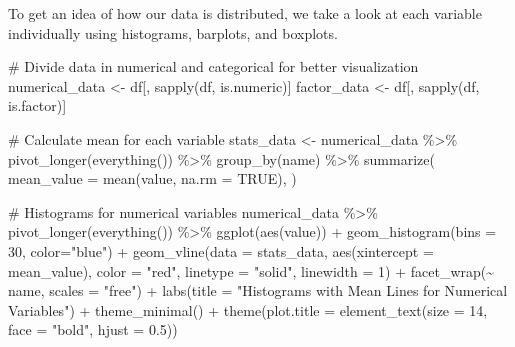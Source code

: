 \documentclass[
  letterpaper,
  DIV=11,
  numbers=noendperiod]{scrartcl}
\newenvironment{Shaded}{\begin{snugshade}}{\end{snugshade}}
\newcommand{\AttributeTok}[1]{\textcolor[rgb]{0.40,0.45,0.13}{#1}}
\newcommand{\CommentTok}[1]{\textcolor[rgb]{0.37,0.37,0.37}{#1}}
\newcommand{\ConstantTok}[1]{\textcolor[rgb]{0.56,0.35,0.01}{#1}}
\newcommand{\DecValTok}[1]{\textcolor[rgb]{0.68,0.00,0.00}{#1}}
\newcommand{\FloatTok}[1]{\textcolor[rgb]{0.68,0.00,0.00}{#1}}
\newcommand{\FunctionTok}[1]{\textcolor[rgb]{0.28,0.35,0.67}{#1}}
\newcommand{\NormalTok}[1]{\textcolor[rgb]{0.00,0.23,0.31}{#1}}
\newcommand{\OtherTok}[1]{\textcolor[rgb]{0.00,0.23,0.31}{#1}}
\newcommand{\SpecialCharTok}[1]{\textcolor[rgb]{0.37,0.37,0.37}{#1}}
\newcommand{\StringTok}[1]{\textcolor[rgb]{0.13,0.47,0.30}{#1}}
\begin{document}
To get an idea of how our data is distributed, we take a look at each
variable individually using histograms, barplots, and boxplots.

\begin{Shaded}
\begin{Highlighting}[]
\CommentTok{\# Divide data in numerical and categorical for better visualization}
\NormalTok{numerical\_data }\OtherTok{\textless{}{-}}\NormalTok{ df[, }\FunctionTok{sapply}\NormalTok{(df, is.numeric)]}
\NormalTok{factor\_data }\OtherTok{\textless{}{-}}\NormalTok{ df[, }\FunctionTok{sapply}\NormalTok{(df, is.factor)]}
\end{Highlighting}
\end{Shaded}

\begin{Shaded}
\begin{Highlighting}[]
\CommentTok{\# Calculate mean for each variable}
\NormalTok{stats\_data }\OtherTok{\textless{}{-}}\NormalTok{ numerical\_data }\SpecialCharTok{\%\textgreater{}\%}
  \FunctionTok{pivot\_longer}\NormalTok{(}\FunctionTok{everything}\NormalTok{()) }\SpecialCharTok{\%\textgreater{}\%}
  \FunctionTok{group\_by}\NormalTok{(name) }\SpecialCharTok{\%\textgreater{}\%}
  \FunctionTok{summarize}\NormalTok{(}
    \AttributeTok{mean\_value =} \FunctionTok{mean}\NormalTok{(value, }\AttributeTok{na.rm =} \ConstantTok{TRUE}\NormalTok{),}
\NormalTok{  )}

\CommentTok{\# Histograms for numerical variables}
\NormalTok{numerical\_data }\SpecialCharTok{\%\textgreater{}\%}
  \FunctionTok{pivot\_longer}\NormalTok{(}\FunctionTok{everything}\NormalTok{()) }\SpecialCharTok{\%\textgreater{}\%}
  \FunctionTok{ggplot}\NormalTok{(}\FunctionTok{aes}\NormalTok{(value)) }\SpecialCharTok{+}
  \FunctionTok{geom\_histogram}\NormalTok{(}\AttributeTok{bins =} \DecValTok{30}\NormalTok{, }\AttributeTok{color=}\StringTok{"blue"}\NormalTok{) }\SpecialCharTok{+}
  \FunctionTok{geom\_vline}\NormalTok{(}\AttributeTok{data =}\NormalTok{ stats\_data, }\FunctionTok{aes}\NormalTok{(}\AttributeTok{xintercept =}\NormalTok{ mean\_value), }\AttributeTok{color =} \StringTok{"red"}\NormalTok{, }
             \AttributeTok{linetype =} \StringTok{"solid"}\NormalTok{, }\AttributeTok{linewidth =} \DecValTok{1}\NormalTok{) }\SpecialCharTok{+}
  \FunctionTok{facet\_wrap}\NormalTok{(}\SpecialCharTok{\textasciitilde{}}\NormalTok{ name, }\AttributeTok{scales =} \StringTok{"free"}\NormalTok{) }\SpecialCharTok{+}
  \FunctionTok{labs}\NormalTok{(}\AttributeTok{title =} \StringTok{"Histograms with Mean Lines for Numerical Variables"}\NormalTok{) }\SpecialCharTok{+}
  \FunctionTok{theme\_minimal}\NormalTok{() }\SpecialCharTok{+}
  \FunctionTok{theme}\NormalTok{(}\AttributeTok{plot.title =} \FunctionTok{element\_text}\NormalTok{(}\AttributeTok{size =} \DecValTok{14}\NormalTok{, }\AttributeTok{face =} \StringTok{"bold"}\NormalTok{, }\AttributeTok{hjust =} \FloatTok{0.5}\NormalTok{))}
\end{Highlighting}
\end{Shaded}
\end{document}

